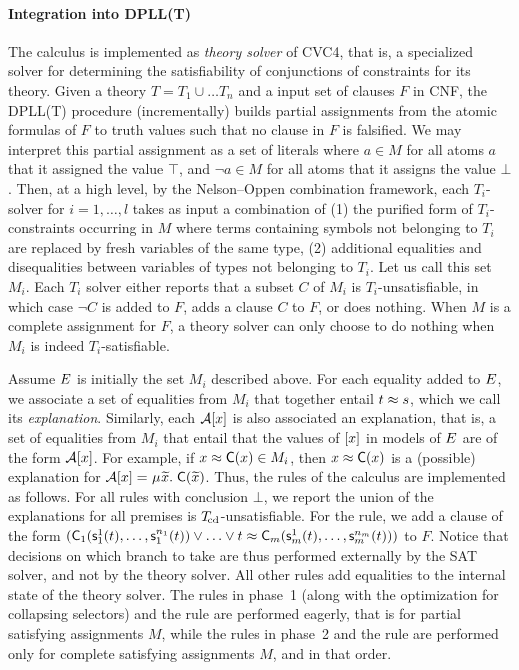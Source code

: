 \paragraph{Integration into DPLL(T)}
The calculus is implemented as \emph{theory solver} of CVC4,
that is, a specialized solver for determining the satisfiability of conjunctions of constraints for its theory.
Given a theory $T = T_1 \mathrel\cup \ldots T_n$ and a input set of clauses $F$ in CNF,
the DPLL(T)  procedure
(incrementally) builds partial assignments from the atomic formulas of $F$ to truth values such that no clause in $F$ is falsified.
We may interpret this partial assignment as a set of literals where $a \in M$ for all atoms $a$ that it assigned the value $\top$, and $\neg a \in M$ for all atoms that it assigns the value $\bot$.
Then, at a high level, by the Nelson--Oppen combination framework,
each $T_i$-solver for $i = 1, \ldots, l$ takes as input a combination of (1) the purified form of $T_i$-constraints occurring in $M$ where terms containing symbols not belonging to $T_i$ are replaced by fresh variables of the same type,
(2) additional equalities and disequalities between variables of types not belonging to $T_i$.
Let us call this set $M_i$.
Each $T_i$ solver either
reports that a subset $C$ of $M_i$ is $T_i$-unsatisfiable, in which case $\neg C$ is added to $F$,
adds a clause $C$ to $F$,
or does nothing.
When $M$ is a complete assignment for $F$, a theory solver can only choose to do nothing when $M_i$ is indeed $T_i$-satisfiable.

Assume $E$ is initially the set $M_i$ described above.
For each equality added to $E$, we associate a set of equalities from $M_i$ that together entail $t \approx s$,
which we call its \emph{explanation}.
Similarly, each $\mathcal{A} [x]$ is also associated an explanation, that is,
a set of equalities from $M_i$ that entail that the values of $[x]$ in models of $E$ are of the form $\mathcal{A} [x]$.
For example, if $x \approx \textsf{C}( x ) \in M_i$, then $x \approx \textsf{C}( x )$ is a (possible) explanation for $\Val \ec{x} = \MU {\Varec{x}}.\; \const{C}( {\Varec{x}} )$.
Thus, the rules of the calculus are implemented as follows.
For all rules with conclusion $\bot$,
we report the union of the explanations for all premises is $T_{\!\mathrm{cd}}$-unsatisfiable.
For the  rule, we add a clause of the form
$(\textsf{C}_1( \textsf{s}^1_1( t ), \ldots, \textsf{s}^{n_1}_1( t ) ) \vee \ldots \vee t \approx \textsf{C}_m( \textsf{s}^1_m( t ), \ldots, \textsf{s}^{n_m}_m( t ) ))$
to $F$.
Notice that decisions on which branch to take are thus performed externally by the SAT solver, and not by the theory solver.
All other rules add equalities to the internal state of the theory solver.
The rules in phase~1 (along with the optimization for collapsing selectors) and the  rule are performed eagerly,
that is for partial satisfying assignments $M$, while the rules in phase~2 and the  rule are performed only for complete satisfying assignments $M$,
and in that order.


